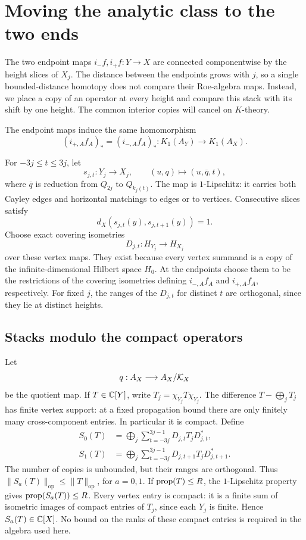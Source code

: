 \section{Moving the analytic class to the two ends}\label{sec:sliding}

The two endpoint maps $i_-f,i_+f:Y\to X$ are connected componentwise
by the height slices of $X_j$.  The distance between the endpoints grows
with $j$, so a single bounded-distance homotopy does not compare their
Roe-algebra maps.  Instead, we place a copy of an operator at every
height and compare this stack with its shift by one height.  The common
interior copies will cancel on $K$-theory.

\begin{proposition}\label{ana:endpoints}
The endpoint maps induce the same homomorphism
\[
 (i_{+,A}f_A)_*=(i_{-,A}f_A)_*:
 K_1(A_Y)\longrightarrow K_1(A_X).
\]
\end{proposition}

For $-3j\le t\le3j$, let
\[
 s_{j,t}:Y_j\longrightarrow X_j,
 \qquad (u,q)\longmapsto (u,\overline q,t),
\]
where $\overline q$ is reduction from $Q_{2j}$ to $Q_{k_j(t)}$.
The map is $1$-Lipschitz: it carries both Cayley edges and horizontal
matchings to edges or to vertices.  Consecutive slices satisfy
\begin{equation}\label{eq:successive-slices}
 d_X(s_{j,t}(y),s_{j,t+1}(y))=1.
\end{equation}
Choose exact covering isometries
\[
 D_{j,t}:H_{Y_j}\longrightarrow H_{X_j}
\]
over these vertex maps.  They exist because every vertex summand is a
copy of the infinite-dimensional Hilbert space $H_0$.  At the endpoints
choose them to be the restrictions of the covering isometries defining
$i_{-,A}f_A$ and $i_{+,A}f_A$, respectively.  For fixed $j$, the ranges
of the $D_{j,t}$ for distinct $t$ are orthogonal, since they lie at
distinct heights.

\subsection{Stacks modulo the compact operators}

Let
\[
 q:A_X\longrightarrow A_X/\mathcal K_X
\]
be the quotient map.  If $T\in\mathbb C[Y]$, write
$T_j=\chi_{Y_j}T\chi_{Y_j}$.  The difference
$T-\bigoplus_jT_j$ has finite vertex support: at a fixed propagation
bound there are only finitely many cross-component entries.  In
particular it is compact.  Define
\begin{align}
 S_0(T)&=\bigoplus_j\sum_{t=-3j}^{3j-1}
                D_{j,t}T_jD_{j,t}^*,\label{eq:stack-zero}\\
 S_1(T)&=\bigoplus_j\sum_{t=-3j}^{3j-1}
                D_{j,t+1}T_jD_{j,t+1}^*.
                \label{eq:stack-one}
\end{align}
The number of copies is unbounded, but their ranges are orthogonal.
Thus $\|S_a(T)\|_{\mathrm{op}}\le\|T\|_{\mathrm{op}}$, for $a=0,1$.
If $\operatorname{prop}(T)\le R$, the $1$-Lipschitz property gives
$\operatorname{prop}(S_a(T))\le R$.
Every vertex entry is compact: it is a finite sum of isometric images
of compact entries of $T_j$, since each $Y_j$ is finite.  Hence
$S_a(T)\in\mathbb C[X]$.  No bound on the ranks of these compact entries is
required in the algebra used here.

